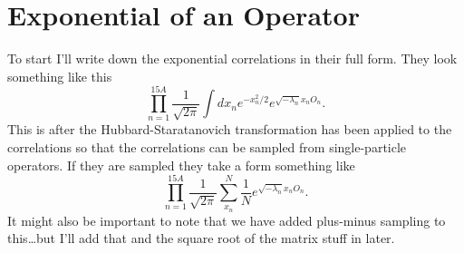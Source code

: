 \documentclass[12pt]{extarticle}
\begin{document}
\section{Exponential of an Operator}
To start I'll write down the exponential correlations in their full form. They look something like this
\begin{equation}
   \prod\limits_{n=1}^{15A} \frac{1}{\sqrt{2\pi}}\int dx_n e^{-x_n^2/2}e^{\sqrt{-\lambda_n}x_nO_n}.
\end{equation}
This is after the Hubbard-Staratanovich transformation has been applied to the correlations so that the correlations can be sampled from single-particle operators. If they are sampled they take a form something like
\begin{equation}
   \prod\limits_{n=1}^{15A} \frac{1}{\sqrt{2\pi}}\sum\limits_{x_n}^N\frac{1}{N}e^{\sqrt{-\lambda_n}x_nO_n}.
\end{equation}
It might also be important to note that we have added plus-minus sampling to this\ldots but I'll add that and the square root of the matrix stuff in later.
\end{document}
